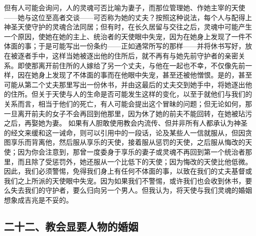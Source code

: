 但有人可能会询问，人的灵魂可否比喻为妻子，而那位管理她、作她主宰的天使——她与这位至高者交谈——可否称为她的丈夫？按照这种说法，每个人与配得上神圣天使守护的灵魂合法同居；但有时，在长久居留与交往之后，灵魂中可能产生一个原因，使她在她的主上、统治者的天使眼中失宠，因为在她身上发现了一件不体面的事；于是可能写出一份条约——正如通常所写的那样——并将休书写好，放在被逐者手中，这样当她被逐出他的住所后，就不再有与她先前守护者的亲密关系。即使那离开前住所的人嫁给了另一个丈夫，与他在一起也不幸，不仅像先前一样，因在她身上发现了不体面的事而在他眼中失宠，甚至还被他憎恨。是的，甚至可能从第二个丈夫那里写出一份休书，并由这最后的丈夫交到她手中，将她逐出他的住所。但关于天使与人的生命是否可能发生这样的变化，以至于就他们与我们的关系而言，相当于他们的死亡，有人可能会提出这个冒昧的问题；但无论如何，那一旦离开前夫的女子不会再回到他那里，因为休了她的前夫不能回转，在她被玷污之后，再娶她为妻。 如果有人胆敢使用教会内流传、但并非所有人都承认为神圣的经文来缓和这一诫命，则可以引用中的一段话，论及某些人一信就服从，但因贪图享乐而背离他，然后服从享乐的天使，接着服从惩罚的天使，之后服从悔改的天使；因为你会注意到，那曾一度委身于享乐的妻子或灵魂不再回到第一个统治者那里，而且除了受惩罚外，她还服从一个比低下的天使；因为悔改的天使比他低微。因此，我们必须警惕，免得我们身上有任何不体面的事，以致在我们的丈夫基督或我们之上所派的天使眼中失宠。因为如果我们不警惕，或许我们也会收到休书，要么失去我们的守护者，要么归向另一个男人。但我认为，将天使与我们灵魂的婚姻想象成吉兆是不妥的。\par


\subsection{二十二、教会显要人物的婚姻}

